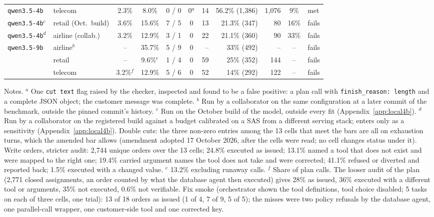\begin{table}[tbp]
\begin{center}
{\begin{tabular}{@{}llccccrrrcl@{}}
\texttt{qwen3.5-4b} & telecom & 2.3\% & 8.0\% & 0 / 0 & 0$^{a}$ & 14 & 56.2\% (1,386) & 1,076 & 9\% & met \\
\texttt{qwen3.5-4b}$^{c}$ & retail (Oct.\ build) & 3.6\% & 15.6\% & 7 / 5 & 0 & 13 & 21.3\% (347) & 80 & 16\% & fails \\
\texttt{qwen3.5-4b}$^{d}$ & airline (collab.) & 3.2\% & 12.9\% & 3 / 1 & 0 & 22 & 21.1\% (360) & 90 & 33\% & fails \\
\texttt{qwen3.5-9b} & airline$^{b}$ & -- & 35.7\% & 5 / 9 & 0 & -- & 33\% (492) & -- & -- & fails \\
 & retail & -- & 9.6\%$^{e}$ & 1 / 4 & 0 & 59 & 25\% (352) & 144 & -- & fails \\
 & telecom & 3.2\%$^{f}$ & 12.9\% & 5 / 6 & 0 & 52 & 14\% (292) & 122 & -- & fails \\
\bottomrule
\end{tabular}}
\end{center}
\vspace{2pt}
{\footnotesize\setlength{\parindent}{0pt} Notes. $^{a}$ One \texttt{cut text} flag raised by the checker, inspected and found to be a false positive: a plan call with \texttt{finish\_reason: length} and a complete JSON object; the customer message was complete. $^{b}$ Run by a collaborator on the same configuration at a later commit of the benchmark, outside the pinned commit's history. $^{c}$ Run on the October build of the model, outside every fit (Appendix~\ref{app:local4b}). $^{d}$ Run by a collaborator on the registered build against a budget calibrated on a SAS from a different serving stack; enters only as a sensitivity (Appendix~\ref{app:local4b}). Double cuts: the three non-zero entries among the 13 cells that meet the bars are all on exhaustion turns, which the amended bar allows (amendment adopted 17 October 2026, after the cells were read; no cell changes status under it). Write orders, stricter audit: 2,744 unique orders over the 13 cells; 24.8\% executed as issued; 13.1\% named a tool that does not exist and were mapped to the right one; 19.4\% carried argument names the tool does not take and were corrected; 41.1\% refused or diverted and reported back; 1.5\% executed with a changed value. $^{e}$ 13.2\% excluding runaway calls. $^{f}$ Share of plan calls. The looser audit of the plan (2,771 closed assignments, an order counted by what the database agent then executed) gives 28\% as issued, 36\% executed with a different tool or arguments, 35\% not executed, 0.6\% not verifiable. Fix smoke (orchestrator shown the tool definitions, tool choice disabled; 5 tasks on each of three cells, one trial): 13 of 18 orders as issued (1 of 4, 7 of 9, 5 of 5); the misses were two policy refusals by the database agent, one parallel-call wrapper, one customer-side tool and one corrected key.\par}
\end{table}

